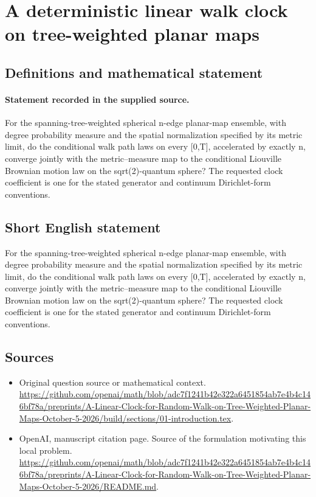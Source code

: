 \documentclass[11pt]{article}
\begin{document}
\section*{A deterministic linear walk clock on tree-weighted planar maps}\label{30007404}
\subsection{Definitions and mathematical statement}
\paragraph{Statement recorded in the supplied source.}
For the spanning-tree-weighted spherical n-edge planar-map ensemble, with degree probability measure and the spatial normalization specified by its metric limit, do the conditional walk path laws on every [0,T], accelerated by exactly n, converge jointly with the metric–measure map to the conditional Liouville Brownian motion law on the sqrt(2)-quantum sphere? The requested clock coefficient is one for the stated generator and continuum Dirichlet-form conventions.
\subsection{Short English statement}
For the spanning-tree-weighted spherical n-edge planar-map ensemble, with degree probability measure and the spatial normalization specified by its metric limit, do the conditional walk path laws on every [0,T], accelerated by exactly n, converge jointly with the metric–measure map to the conditional Liouville Brownian motion law on the sqrt(2)-quantum sphere? The requested clock coefficient is one for the stated generator and continuum Dirichlet-form conventions.
\subsection{Sources}
\begin{itemize}
\item[S1] Original question source or mathematical context.
\url{https://github.com/openai/math/blob/adc7f1241b42e322a6451854ab7e4b4c146bf78a/preprints/A-Linear-Clock-for-Random-Walk-on-Tree-Weighted-Planar-Maps-October-5-2026/build/sections/01-introduction.tex}.
\item[S2] OpenAI, manuscript citation page. Source of the formulation motivating this local problem.
\url{https://github.com/openai/math/blob/adc7f1241b42e322a6451854ab7e4b4c146bf78a/preprints/A-Linear-Clock-for-Random-Walk-on-Tree-Weighted-Planar-Maps-October-5-2026/README.md}.
\end{itemize}
\end{document}
